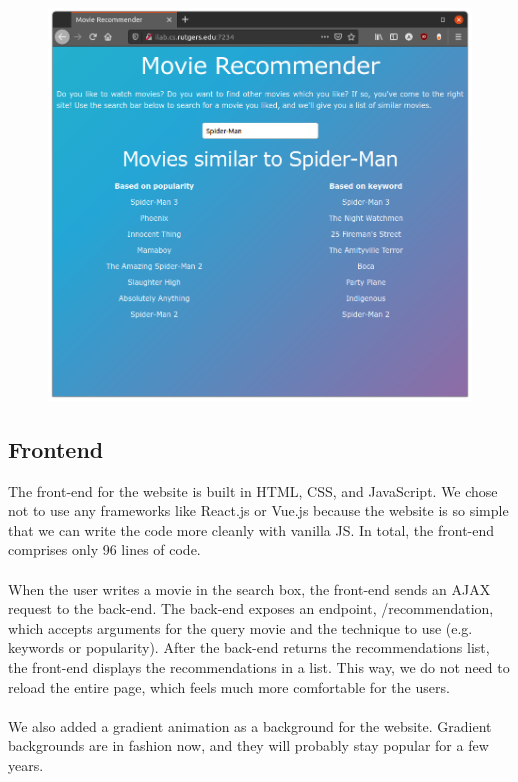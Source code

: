 \documentclass[10pt,conference]{IEEEtran}
\begin{document}
\begin{figure}[H]
\centering
\includegraphics[scale=.25]{MovieRecommendation.png}
\label{fig:Movie Recommendation frontend}
\end{figure}

\subsection{\textbf{Frontend}}
The front-end for the website is built in HTML, CSS, and JavaScript. We chose not to use any frameworks like React.js or Vue.js because the website is so simple that we can write the code more cleanly with vanilla JS. In total, the front-end comprises only 96 lines of code.\\\\
When the user writes a movie in the search box, the front-end sends an AJAX request to the back-end. The back-end exposes an endpoint, /recommendation, which accepts arguments for the query movie and the technique to use (e.g. keywords or popularity). After the back-end returns the recommendations list, the front-end displays the recommendations in a list. This way, we do not need to reload the entire page, which feels much more comfortable for the users.\\\\
We also added a gradient animation as a background for the website. Gradient backgrounds are in fashion now, and they will probably stay popular for a few years.
\end{document}
